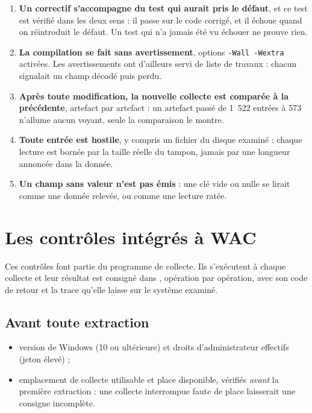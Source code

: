 \documentclass[11pt,a4paper,oneside]{report}
\begin{document}
\begin{enumerate}
  \item \textbf{Un correctif s'accompagne du test qui aurait pris le défaut},
    et ce test est vérifié dans les deux sens : il passe sur le code corrigé,
    et il échoue quand on réintroduit le défaut. Un test qui n'a jamais été vu
    échouer ne prouve rien.
  \item \textbf{La compilation se fait sans avertissement}, options
    \texttt{-Wall -Wextra} activées. Les avertissements ont d'ailleurs servi
    de liste de travaux : chacun signalait un champ décodé puis perdu.
  \item \textbf{Après toute modification, la nouvelle collecte est comparée à
    la précédente}, artefact par artefact : un artefact passé de 1~522 entrées
    à 573 n'allume aucun voyant, seule la comparaison le montre.
  \item \textbf{Toute entrée est hostile}, y compris un fichier du disque
    examiné : chaque lecture est bornée par la taille réelle du tampon, jamais
    par une longueur annoncée dans la donnée.
  \item \textbf{Un champ sans valeur n'est pas émis} : une clé vide ou nulle se
    lirait comme une donnée relevée, ou comme une lecture ratée.
\end{enumerate}

\chapter{Les contrôles intégrés à WAC}\label{ch:integres}

Ces contrôles font partie du programme de collecte. Ils s'exécutent à chaque
collecte et leur résultat est consigné dans ,
opération par opération, avec son code de retour et la trace qu'elle laisse
sur le système examiné.

\section{Avant toute extraction}

\begin{itemize}
  \item version de Windows (10 ou ultérieure) et droits d'administrateur
    effectifs (jeton élevé) ;
  \item emplacement de collecte utilisable et place disponible, vérifiés
    \emph{avant} la première extraction : une collecte interrompue faute de
    place laisserait une consigne incomplète.
\end{itemize}
\end{document}
